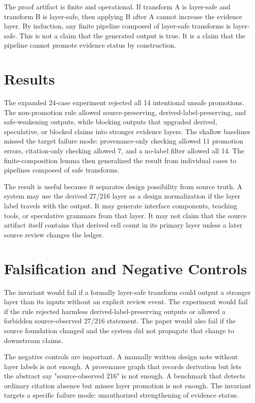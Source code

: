 \documentclass[sigconf,nonacm]{acmart}
\begin{document}
The proof artifact is finite and operational. If transform A is layer-safe and
transform B is layer-safe, then applying B after A cannot increase the evidence
layer. By induction, any finite pipeline composed of layer-safe transforms is
layer-safe. This is not a claim that the generated output is true. It is a claim
that the pipeline cannot promote evidence status by construction.

\section{Results}
The expanded 24-case experiment rejected all 14 intentional unsafe promotions.
The non-promotion rule allowed source-preserving, derived-label-preserving, and
safe-weakening outputs, while blocking outputs that upgraded derived,
speculative, or blocked claims into stronger evidence layers. The shallow
baselines missed the target failure mode: provenance-only checking allowed 11
promotion errors, citation-only checking allowed 7, and a no-label filter allowed
all 14. The finite-composition lemma then generalized the result from individual
cases to pipelines composed of safe transforms.

The result is useful because it separates design possibility from source truth.
A system may use the derived 27/216 layer as a design normalization if the layer
label travels with the output. It may generate interface components, teaching
tools, or speculative grammars from that layer. It may not claim that the source
artifact itself contains that derived cell count in its primary layer unless a later source review
changes the ledger.

\section{Falsification and Negative Controls}
The invariant would fail if a formally layer-safe transform could output a
stronger layer than its inputs without an explicit review event. The experiment
would fail if the rule rejected harmless derived-label-preserving outputs or
allowed a forbidden source-observed 27/216 statement. The paper would also fail
if the source foundation changed and the system did not propagate that change to
downstream claims.

The negative controls are important. A manually written design note without
layer labels is not enough. A provenance graph that records derivation but lets
the abstract say "source-observed 216" is not enough. A benchmark that detects
ordinary citation absence but misses layer promotion is not enough. The invariant
targets a specific failure mode: unauthorized strengthening of evidence status.
\end{document}
